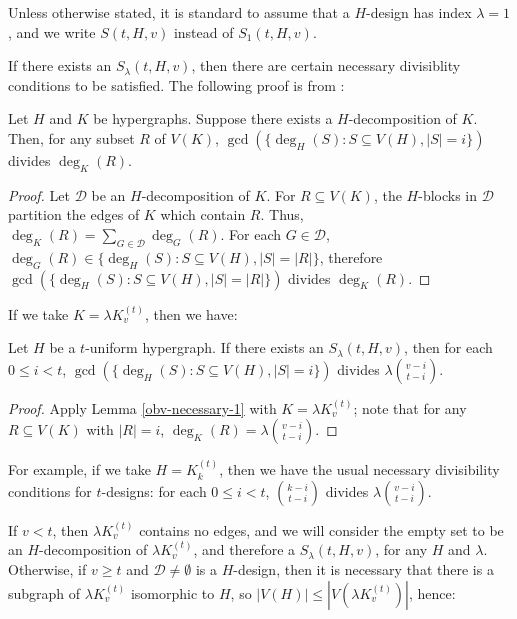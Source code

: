 Unless otherwise stated, it is standard to assume that a $H$-design has index $\lambda = 1$, and we write $S(t, H, v)$ instead of $S_1(t, H, v)$.

If there exists an $S_{\lambda}(t, H, v)$, then there are certain necessary divisiblity conditions to be satisfied.
The following proof is from \cite{bryant}:

\begin{lemma} \label{obv-necessary-1}
Let $H$ and $K$ be hypergraphs.
Suppose there exists a $H$-decomposition of $K$. Then, for any subset $R$ of $V(K)$,
  $\gcd(\{\deg_H(S) : S \subseteq V(H), |S| = i\})$ divides $\deg_K(R)$.
\end{lemma}

\begin{proof}
Let $\mathcal{D}$ be an $H$-decomposition of $K$.
For $R \subseteq V(K)$, the $H$-blocks in $\mathcal{D}$ partition the edges of $K$ which contain $R$.
Thus, $\deg_K(R) = \sum_{G \in \mathcal{D}} \deg_G(R)$.
For each $G \in \mathcal{D}$, $\deg_G(R) \in \{\deg_H(S) : S \subseteq V(H), |S| = |R|\}$,
  therefore $\gcd(\{\deg_H(S) : S \subseteq V(H), |S| = |R|\})$ divides $\deg_K(R)$.
\end{proof}

If we take $K = \lambda K_v^{(t)}$, then we have:

\begin{lemma} \label{obv-necessary}
Let $H$ be a $t$-uniform hypergraph.
If there exists an $S_{\lambda}(t, H, v)$, then for each $0 \leq i < t$,
  $\gcd(\{ \deg_H(S) : S \subseteq V(H), |S| = i \})$ divides $\lambda {v-i \choose t-i}$.
\end{lemma}

\begin{proof}
Apply Lemma \ref{obv-necessary-1} with $K = \lambda K_v^{(t)}$;
  note that for any $R \subseteq V(K)$ with $|R| = i$, $\deg_K(R) = \lambda {v-i \choose t-i}$.
\end{proof}

For example, if we take $H = K_k^{(t)}$, then we have the usual necessary divisibility conditions for $t$-designs: for each $0 \leq i < t$, ${k-i \choose t-i}$ divides $\lambda {v-i \choose t-i}$.

If $v < t$, then $\lambda K_v^{(t)}$ contains no edges, and we will consider the empty set to be an $H$-decomposition of $\lambda K_v^{(t)}$, and therefore a $S_{\lambda}(t, H, v)$, for any $H$ and $\lambda$. Otherwise, if $v \geq t$ and $\mathcal{D} \neq \emptyset$ is a $H$-design, then it is necessary that there is a subgraph of $\lambda K_v^{(t)}$ isomorphic to $H$, so $|V(H)| \leq |V(\lambda K_v^{(t)})|$, hence:

